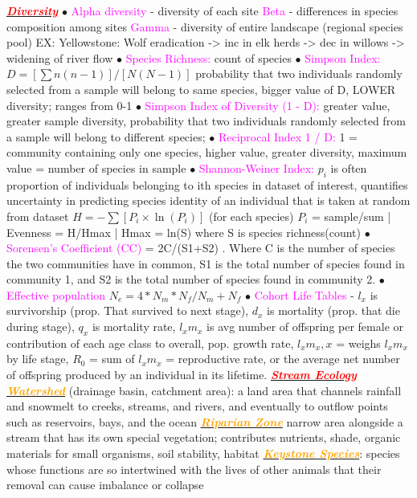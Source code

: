 \documentclass{article}
\newcommand{\ddd}{$\bullet$}
\newcommand{\red}[1]{\textcolor{red}{#1}}
\newcommand{\pink}[1]{\textcolor{magenta}{#1}}
\newcommand{\orange}[1]{\textcolor{orange}{#1}}
\newcommand{\mysection}[1]{\underline{{\textbf{\textit{\red{#1}}}}}}
\newcommand{\mysubsection}[1]{\underline{\textbf{{\textit{\orange{#1}}}}}}
\newcommand{\vocab}[1]{{\pink{#1}}}
\begin{document}
\begin{multicols*}{4}
    \mysection{Diversity}
		\ddd \vocab{ Alpha diversity } - diversity of each site \vocab{ Beta } - differences in species composition among sites \vocab{ Gamma } - diversity of entire landscape (regional species pool) EX: Yellowstone: Wolf eradication -> inc in elk herds -> dec in willows -> widening of river flow \ddd \vocab{ Species Richness: } count of species
		\ddd \vocab{ Simpson Index: } $ D = [\sum n(n-1)]/ [N(N-1)] $ probability that two individuals randomly selected from a sample will belong to same species, bigger value of D, LOWER diversity; ranges from 0-1 
		\ddd \vocab{ Simpson Index of Diversity (1 - D): } greater value, greater sample diversity, probability that two individuals randomly selected from a sample will belong to different species; 
		\ddd \vocab{ Reciprocal Index 1 / D: } 1 = community containing only one species, higher value, greater diversity, maximum value = number of species in sample 
		\ddd \vocab{ Shannon-Weiner Index: } $ p_i $ is often proportion of individuals belonging to ith species in dataset of interest, quantifies uncertainty in predicting species identity of an individual that is taken at random from dataset $ H = - \sum [P_i \times \ln(P_i)] $ (for each species) $ P_i $ = sample/sum | Evenness = H/Hmax | Hmax = ln(S) where S is species richness(count) 
		\ddd \vocab{ Sorensen’s Coefficient (CC) } =  2C/(S1+S2) . Where C is the number of species the two communities have in common, S1 is the total number of species found in community 1, and S2 is the total number of species found in community 2. 
		\ddd \vocab{ Effective population } $ N_e = 4*N_m*N_f / N_m + N_f $ 
		\ddd \vocab{ Cohort Life Tables } - $ l_x $ is survivorship (prop. That survived to next stage), $ d_x $ is mortality (prop. that die during stage), $ q_x $ is mortality rate, $ l_xm_x $ is avg number of offspring per female or contribution of each age class to overall, pop. growth rate, $ l_xm_x,x $ = weighs $ l_xm_x $ by life stage, $ R_0 $ = sum of $ l_xm_x $ = reproductive rate, or the average net number of offspring produced by an individual in its lifetime.
    \mysection{Stream Ecology}
        \mysubsection{Watershed} (drainage basin, catchment area): a land area that channels rainfall and snowmelt to creeks, streams, and rivers, and eventually to outflow points such as reservoirs, bays, and the ocean
        \mysubsection{Riparian Zone} narrow area alongside a stream that has its own special vegetation; contributes nutrients, shade, organic materials for small organisms, soil stability, habitat
        \mysubsection{Keystone Species}:  species whose functions are so intertwined with the lives of other animals that their removal can cause imbalance or collapse

\end{multicols*}
\end{document}
